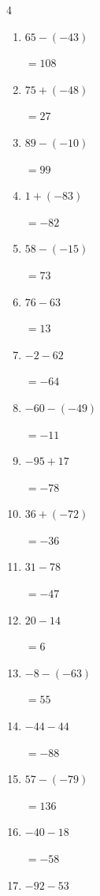 \begin{multicols}{4}
\begin{enumerate}
        $=0$

  \item $65-(-43)$

        $=108$

\columnbreak %

  \item $75+(-48)$

        $=27$

  \item $89-(-10)$

        $=99$

  \item $1+(-83)$

        $=-82$

  \item $58-(-15)$

        $=73$

  \item $76-63$

        $=13$

  \item $-2-62$

        $=-64$

  \item $-60-(-49)$

        $=-11$

  \item $-95+17$

        $=-78$

  \item $36+(-72)$

        $=-36$

  \item $31-78$

        $=-47$

  \item $20-14$

        $=6$

  \item $-8-(-63)$

        $=55$

  \item $-44-44$

        $=-88$

  \item $57-(-79)$

        $=136$

  \item $-40-18$

        $=-58$

  \item $-92-53$


\end{enumerate}
\end{multicols}
